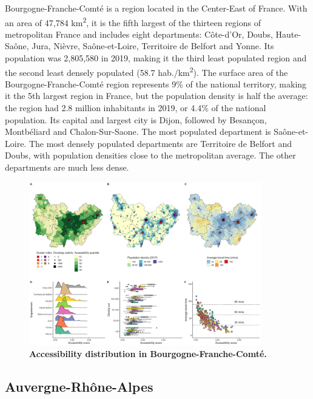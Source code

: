 Bourgogne-Franche-Comté is a region located in the Center-East of France. With an area of 47,784 km\textsuperscript{2}, it is the fifth largest of the thirteen regions of metropolitan France and includes eight departments: Côte-d'Or, Doubs, Haute-Saône, Jura, Nièvre, Saône-et-Loire, Territoire de Belfort and Yonne. Its population was 2,805,580 in 2019, making it the third least populated region and the second least densely populated (58.7 hab./km\textsuperscript{2}). The surface area of the Bourgogne-Franche-Comté region represents 9\% of the national territory, making it the 5th largest region in France, but the population density is half the average: the region had 2.8 million inhabitants in 2019, or 4.4\% of the national population.
Its capital and largest city is Dijon, followed by Besançon, Montbéliard and Chalon-Sur-Saone. The most populated department is Saône-et-Loire.
The most densely populated departments are Territoire de Belfort and Doubs, with population densities close to the metropolitan average. The other departments are much less dense.

\begin{figure}[H]
    \includegraphics[width=0.9\textwidth]{images/camion/region_accessibility/accessibility_Bourgogne-Franche-Comte.png}
    \centering
    \caption{
        \textbf{Accessibility distribution in Bourgogne-Franche-Comté.}
    }
\end{figure}

\subsection*{Auvergne-Rhône-Alpes}

